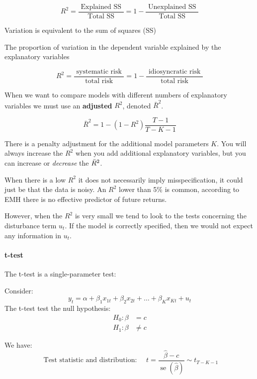\documentclass[11pt]{article}
\begin{document}
\begin{equation}
R^2=\frac{\text { Explained SS }}{\text { Total SS }}=1-\frac{\text { Unexplained SS }}{\text { Total SS }}
\end{equation}

\begin{note}
    Variation is equivalent to the sum of squares (SS)
\end{note}

The proportion of variation in the dependent variable explained by the explanatory variables

\begin{equation}
R^2=\frac{\text { systematic risk }}{\text { total risk }}=1-\frac{\text { idiosyncratic risk }}{\text { total risk }}
\end{equation}

When we want to compare models with different numbers of explanatory variables we must use an \textbf{adjusted} $R^2$, denoted $\bar{R}^2$.

\begin{equation}
\bar{R}^2=1-\left(1-R^2\right) \frac{T-1}{T-K-1}
\end{equation}

There is a penalty adjustment for the additional model parameters $K$. You will always increase the $R^2$ when you add additional explanatory variables, but you can increase or \textit{decrease} the $\Bar{R}^2$.

When there is a low $R^2$ it does not necessarily imply misspecification, it could just be that the data is noisy. An $R^2$ lower than 5\% is common, according to EMH there is no effective predictor of future returns.

However, when the $R^2$ is very small we tend to look to the tests concerning the disturbance term $u_t$. If the model is correctly specified, then we would not expect any information in $u_t$.

\paragraph{t-test} \mbox{}

The t-test is a single-parameter test:
\begin{mdframed}
Consider:
\begin{equation}
y_t=\alpha+\beta_1 x_{1 t}+\beta_2 x_{2 t}+\ldots+\beta_K x_{K t}+u_t
\end{equation}
    The t-test test the null hypothesis:
    \begin{align*}
        H_0: \beta &= c \\
        H_1: \beta &\neq c
    \end{align*}

    We have:
    \begin{equation}
\text { Test statistic and distribution: } \quad t=\frac{\hat{\beta}-c}{\operatorname{se}(\hat{\beta})} \sim t_{T-K-1}
\end{equation}
\end{mdframed}
\end{document}
